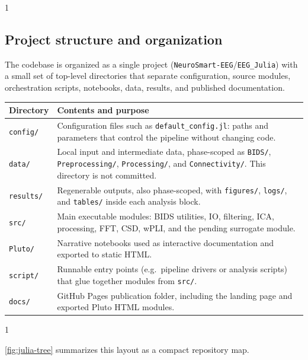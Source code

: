 \begin{multicols}{1}
\subsection{Project structure and organization}

The codebase is organized as a single \Julia{} project (\texttt{NeuroSmart-EEG}/\texttt{EEG\_Julia}) with a small set of top-level directories that separate configuration, source modules, orchestration scripts, notebooks, data, results, and published documentation.

\end{multicols}
\medskip
\noindent
\begin{center}
\small
\begin{tabular}{@{}p{}p{}@{}}
  \toprule
  \textbf{Directory} & \textbf{Contents and purpose} \\
  \midrule
  \texttt{config/} & Configuration files such as \texttt{default\_config.jl}: paths and parameters that control the pipeline without changing code. \\
  \texttt{data/} & Local input and intermediate data, phase-scoped as \texttt{BIDS/}, \texttt{Preprocessing/}, \texttt{Processing/}, and \texttt{Connectivity/}. This directory is not committed. \\
  \texttt{results/} & Regenerable outputs, also phase-scoped, with \texttt{figures/}, \texttt{logs/}, and \texttt{tables/} inside each analysis block. \\
  \texttt{src/} & Main executable \Julia{} modules: BIDS utilities, IO, filtering, ICA, processing, FFT, CSD, wPLI, and the pending surrogate module. \\
  \texttt{Pluto/} & Narrative notebooks used as interactive documentation and exported to static HTML. \\
  \texttt{script/} & Runnable entry points (e.g.\ pipeline drivers or analysis scripts) that glue together modules from \texttt{src/}. \\
  \texttt{docs/} & GitHub Pages publication folder, including the landing page and exported Pluto HTML modules. \\
  \bottomrule
\end{tabular}
\end{center}
\medskip
\begin{multicols}{1}

\cref{fig:julia-tree} summarizes this layout as a compact repository map.

\end{multicols}
